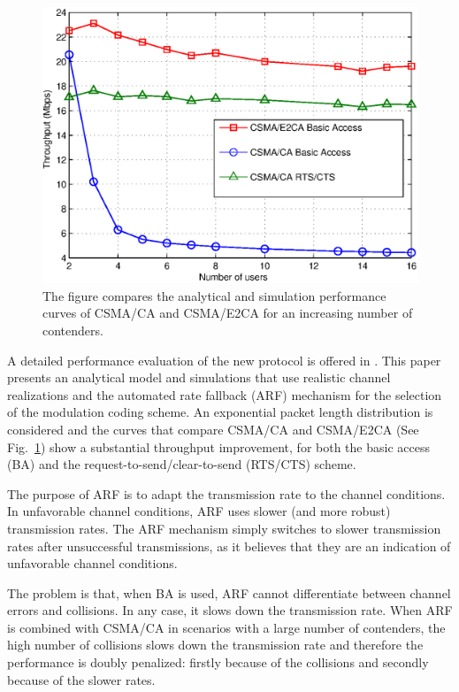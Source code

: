 \documentclass[journal]{IEEEtran}
\begin{document}
\begin{figure}[!t]
\centering
\includegraphics[width=\linewidth]{figures/performance}
\caption{The figure compares the analytical and simulation performance curves of CSMA/CA and CSMA/E2CA for an increasing number of contenders.}
\label{fig:performance}
\end{figure}

A detailed performance evaluation of the new protocol is offered in \cite{martorell2012pec}.
This paper presents an analytical model and simulations that use realistic channel realizations and the automated rate fallback (ARF) mechanism for the selection of the modulation coding scheme.
An exponential packet length distribution is considered and the curves that compare CSMA/CA and CSMA/E2CA (See Fig.~\ref{fig:performance}) show a substantial throughput improvement, for both the basic access (BA) and the request-to-send/clear-to-send (RTS/CTS) scheme.

The purpose of ARF is to adapt the transmission rate to the channel conditions.
In unfavorable channel conditions, ARF uses slower (and more robust) transmission rates.
The ARF mechanism simply switches to slower transmission rates after unsuccessful transmissions, as it believes that they are an indication of unfavorable channel conditions.

The problem is that, when BA is used, ARF cannot differentiate between channel errors and collisions.
In any case, it slows down the transmission rate.
When ARF is combined with CSMA/CA in scenarios with a large number of contenders, the high number of collisions slows down the transmission rate and therefore the performance is doubly penalized: firstly because of the collisions and secondly because of the slower rates.
\end{document}
